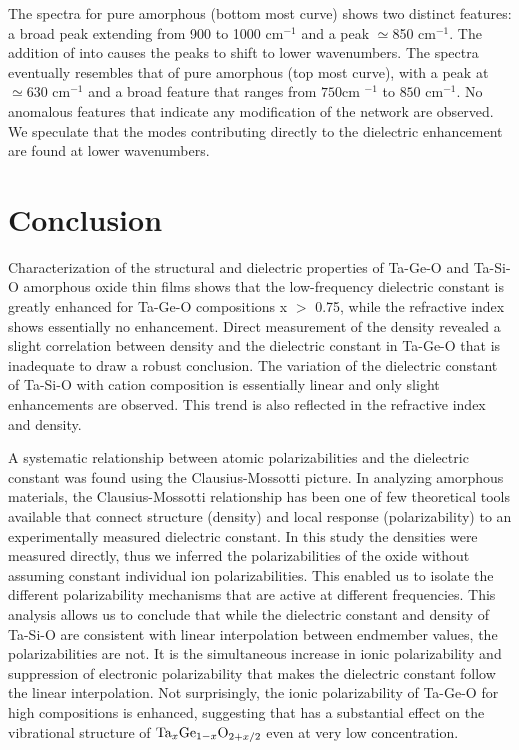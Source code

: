\documentclass[aip,jap,numerical,citeautoscript,preprint]{revtex4-1}
\begin{document}
The spectra for pure amorphous  (bottom most curve) shows two distinct features: a broad peak extending from 900 to 1000 cm$^{-1}$ and a peak $\simeq$850 cm$^{-1}$. The addition of  into  causes the peaks to shift to lower wavenumbers. 
The spectra eventually resembles that of pure amorphous  (top most curve), with a peak at $\simeq 630 $ cm$^{-1}$ and a broad feature that ranges from $750$cm $^{-1}$ to $850$ cm$^{-1}$. No anomalous features that indicate any modification of the network are observed. We speculate that the modes contributing directly to the dielectric enhancement are found at lower wavenumbers. 

\section{Conclusion}

Characterization of the structural and dielectric properties of Ta-Ge-O and Ta-Si-O amorphous oxide thin films shows that the low-frequency dielectric constant is greatly enhanced for Ta-Ge-O compositions x $>$ 0.75, while the refractive index shows essentially no enhancement. Direct measurement of the density revealed a slight correlation between density and the dielectric constant in Ta-Ge-O that is inadequate to draw a robust conclusion. The variation of the dielectric constant of Ta-Si-O with cation composition is essentially linear and only slight enhancements are observed. This trend is also reflected in the refractive index and density. 

A systematic relationship between atomic polarizabilities and the dielectric constant was found using the Clausius-Mossotti picture. In analyzing amorphous materials, the Clausius-Mossotti relationship has been one of few theoretical tools available that connect structure (density) and local response (polarizability) to an experimentally measured dielectric constant. 
In this study the densities were measured directly, thus we inferred the polarizabilities of the oxide without assuming constant individual ion polarizabilities. This enabled us to isolate the different polarizability mechanisms that are active at different frequencies. This analysis allows us to conclude that while the dielectric constant and density of Ta-Si-O are consistent with linear interpolation between endmember values, the polarizabilities are not. It is the simultaneous increase in ionic polarizability and suppression of electronic polarizability that makes the dielectric constant follow the linear interpolation. 
Not surprisingly, the ionic polarizability of Ta-Ge-O for high  compositions is enhanced, suggesting that  has a substantial effect on the vibrational structure of $\textnormal{Ta}_{x}\textnormal{Ge}_{1-x}\textnormal{O}_{2+x/2}$ even at very low  concentration. 
\end{document}
